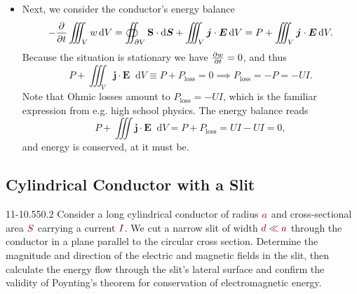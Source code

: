 \documentclass[11pt, a4paper]{article}
\newcommand{\diff}{\mathop{}\!\mathrm{d}} %
\newcommand{\dmath}[1]{\textcolor{Maroon}{#1}}  %
\renewcommand{\vec}[1]{\bm{#1}} %
\newcommand{\E}{\vec{E}}  %
\renewcommand{\S}{\mathbf{S}}  %
\newcommand{\defaultQuestionWidth}{0.55}
\begin{document}
\begin{itemize}
	\item Next, we consider the conductor's energy balance
	\begin{equation*}
		- \pdv{t}\iiint_{V}w \diff V = \oiint_{\partial V} \S \cdot \diff \vec{S} + \iiint_{V} \vec{j} \cdot \E \diff V =  P + \iiint_{V} \vec{j} \cdot \E \diff V.
	\end{equation*}
	Because the situation is stationary we have $ \pdv{w}{t} = 0$, and thus
	\begin{equation*}
		P + \iiint_{V} \vec{j} \cdot \E \diff V \equiv P + P_{\text{loss}} = 0 \implies P_{\text{loss}} = -P = -UI.
	\end{equation*}
	Note that Ohmic losses amount to $ P_{\text{loss}} = -UI $, which is the familiar expression from e.g. high school physics. The energy balance reads
	\begin{equation*}
		P + \iiint \vec{j} \cdot \E \diff V =  P + P_{\text{loss}} = UI - UI = 0,
	\end{equation*}
	and energy is conserved, at it must be. 
	
	
\end{itemize}

\subsection{Cylindrical Conductor with a Slit}
\begin{figurequestion}{11-1}{\defaultQuestionWidth}{0.2}
Consider a long cylindrical conductor of radius $ \dmath{a} $ and cross-sectional area $ \dmath{S} $ carrying a current $ \dmath{I} $. We cut a narrow slit of width $ \dmath{d \ll a} $ through the conductor in a plane parallel to the circular cross section. Determine the magnitude and direction of the electric and magnetic fields in the slit, then calculate the energy flow through the slit's lateral surface and confirm the validity of Poynting's theorem for conservation of electromagnetic energy.
\end{figurequestion}
\end{document}
